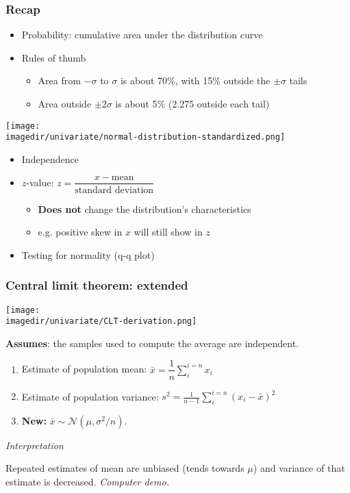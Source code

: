 \begin{frame}\frametitle{Recap}
	\begin{itemize}
		\item Probability: cumulative area under the distribution curve
		\item Rules of thumb
		\begin{itemize}
			\item Area from $-\sigma$ to $\sigma$ is about 70\%, with 15\% outside the $\pm \sigma$ tails
			\item Area outside $\pm 2\sigma$ is about 5\% (2.275 outside each tail)
		\end{itemize}
	\end{itemize}
	\texttt{[image: \\imagedir/univariate/normal-distribution-standardized.png]}
	\begin{itemize}
		\item Independence
		\item $z$-value: $z = \dfrac{x - \text{mean}}{\text{standard deviation}}$
		\begin{itemize}
			\item \textbf{Does not} change the distribution's characteristics
			\item e.g. positive skew in $x$ will still show in $z$
		\end{itemize}
		\item Testing for normality (q-q plot)
	\end{itemize}
\end{frame}

\begin{frame}\frametitle{Central limit theorem: extended}

	\texttt{[image: \\imagedir/univariate/CLT-derivation.png]}

	\textbf{Assumes}: the samples used to compute the average are independent.
	\begin{enumerate}
		\item Estimate of population mean: $\bar{x} = \displaystyle \dfrac{1}{n} \sum_i^{i=n}{x_i}$
		\item Estimate of population variance: $s^2 =\displaystyle \frac{1}{n-1}\sum_i^{i=n}{(x_i - \bar{x})^2}$
		\item \textbf{New:} $\bar{x} \sim \mathcal{N}\left(\mu, \sigma^2/n \right)$.
	\end{enumerate}

	\emph{Interpretation}

	Repeated estimates of mean are unbiased (tends towards $\mu$) and variance of that estimate is decreased. \emph{Computer demo.}
\end{frame}

